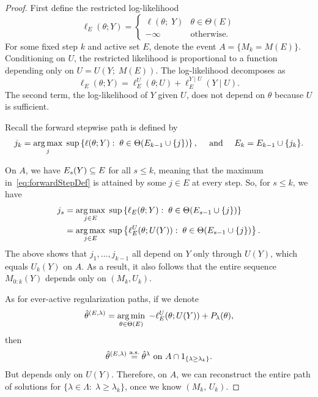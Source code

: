 \documentclass{article}
\begin{document}
\begin{proof}
First define the restricted log-likelihood
\begin{equation*}
\ell_E(\theta; Y) = \left\{\begin{matrix} 
    \ell(\theta; \;Y) & \theta \in \Theta(E)\\ 
    -\infty  & \mathrm{ otherwise.}\end{matrix}\right. 
\end{equation*}
For some fixed step $k$ and active set $E$, denote the event $A=\{M_k = M(E)\}$. Conditioning on $U$, the restricted likelihood is proportional to a function depending only on $U = U(Y; \;M(E))$. The log-likelihood decomposes as
\[
\ell_E(\theta; Y) = \ell_E^{U}(\theta; U) 
+ \ell_E^{Y \mid U}(Y \mid U).
\]
The second term, the log-likelihood of $Y$ given $U$, does not depend on $\theta$ because $U$ is sufficient.

Recall the forward stepwise path is defined by
  \begin{equation}\label{eq:forwardStepDef}
    j_k = \operatorname*{arg\,max}_j \;\sup \left\{\ell(\theta; Y):\; \theta\in\Theta(E_{k-1} \cup \{j\})\right\}, \quad \text{ and } \quad
    E_k = E_{k-1} \cup \{j_k\}.
  \end{equation}

  On $A$, we have $E_s(Y) \subseteq E$ for all $s\leq k$, meaning that the maximum in~\eqref{eq:forwardStepDef} is attained by some $j\in E$ at every step. So, for $s \leq k$, we have
\begin{align*}
  j_s &= \operatorname*{arg\,max}_{j\in E} \;\sup \left\{\ell_E(\theta; Y):\;
    \theta\in\Theta(E_{s-1} \cup \{j\})\right\} \\
  &= \operatorname*{arg\,max}_{j\in E} \;\sup \left\{\ell_E^U(\theta; U(Y)):\;
    \theta\in\Theta(E_{s-1} \cup \{j\})\right\}. 
\end{align*}
The above shows that $j_1,\ldots, j_{k-1}$ all depend on $Y$ only through $U(Y)$, which equals $U_k(Y)$ on $A$. As a result, it also follows that the entire sequence $M_{0:k}(Y)$ depends only on $(M_k, U_k)$.

As for ever-active regularization paths, if we denote 
\[
\hat\theta^{(E,\lambda)} = \operatorname*{arg\,min}_{\theta\in\Theta(E)} \; -\ell_E^{U}(\theta; U(Y)) + P_\lambda(\theta),
\]
then 
\[
\hat\theta^{(E,\lambda)} \overset{\textrm{a.s.}}{=} \hat\theta^{\lambda} \text{ on } 
A \cap 1_{\{\lambda \geq \lambda_k\}}.
\]
But  depends only on $U(Y)$. Therefore, on $A$, we can reconstruct the entire path of solutions for $\{\lambda\in \Lambda:\; \lambda\geq \lambda_k\}$, once we know $(M_k,\,U_k)$.
\end{proof}
\end{document}

